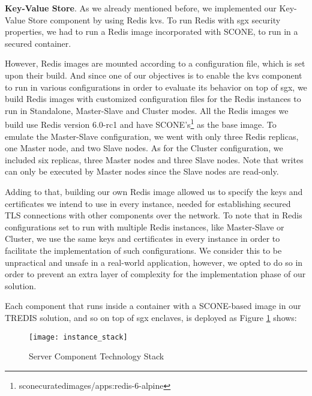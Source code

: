 \vspace{3mm}
\textbf{Key-Value Store}. As we already mentioned before, we implemented our Key-Value Store component by using Redis \gls{kvs}. To run Redis with \gls{sgx} security properties, we had to run a Redis image incorporated with SCONE, to run in a secured container. 

However, Redis images are mounted according to a configuration file, which is set upon their build. 
And since one of our objectives is to enable the \gls{kvs} component to run in various configurations in order to evaluate its behavior on top of \gls{sgx}, we build Redis images with customized configuration files for the Redis instances to run in Standalone, Master-Slave and Cluster modes. All the Redis images we build use Redis version 6.0-rc1 and have SCONE's\footnote{sconecuratedimages/apps:redis-6-alpine} as the base image. To emulate the Master-Slave configuration, we went with only three Redis replicas, one Master node, and two Slave nodes. As for the Cluster configuration, we included six replicas, three Master nodes and three Slave nodes. Note that writes can only be executed by Master nodes since the Slave nodes are read-only.

Adding to that, building our own Redis image allowed us to specify the keys and certificates we intend to use in every instance, needed for establishing secured TLS connections with other components over the network. To note that in Redis configurations set to run with multiple Redis instances, like Master-Slave or Cluster, we use the same keys and certificates in every instance in order to facilitate the implementation of such configurations. We consider this to be unpractical and unsafe in a real-world application, however, we opted to do so in order to prevent an extra layer of complexity for the implementation phase of our solution.


\vspace{3mm}
Each component that runs inside a container with a SCONE-based image in our TREDIS solution, and so on top of \gls{sgx} enclaves, is deployed as Figure \ref{fig:instanceStack} shows:
\begin{figure}[htbp]
	\centering
	{\texttt{[image: instance\_stack]}}
	\caption{Server Component Technology Stack}
	\label{fig:instanceStack}
\end{figure}

